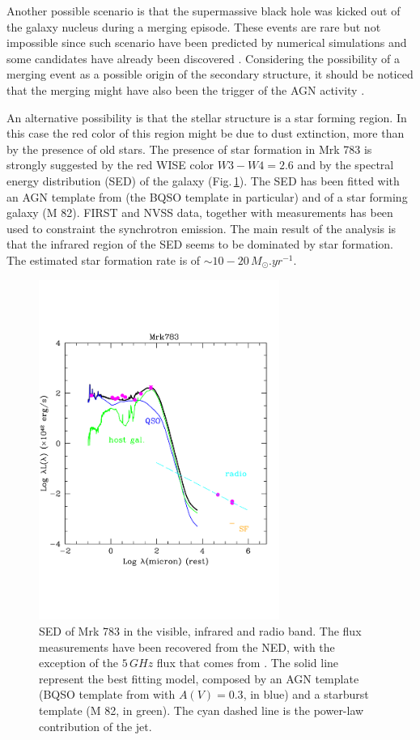 \documentclass[../main.tex]{subfiles}
\begin{document}
Another possible scenario is that the supermassive black hole was kicked out of the galaxy nucleus during a merging episode.
These events are rare but not impossible since such scenario have been predicted by numerical simulations and some candidates have already been discovered \citep[for a review see][]{Komossa12}.
Considering the possibility of a merging event as a possible origin of the secondary structure, it should be noticed that the merging  might have also been the trigger of the AGN activity \citep{Hong15}.

An alternative possibility is that the stellar structure is a star forming region.
In this case the red color of this region might be due to dust extinction, more than by the presence of old stars.
The presence of star formation in Mrk 783 is strongly suggested by the red WISE color $W3-W4=2.6$ and by the spectral energy distribution (SED) of the galaxy (Fig.\,\ref{fig:SED_mrk}).
The SED has been fitted with an AGN template from \citet{Polletta07} (the BQSO template in particular) and of a star forming galaxy (M 82).
FIRST and NVSS data, together with \citet{Congiu17} measurements has been used to constraint the synchrotron emission.
The main result of the analysis is that the infrared region of the SED seems to be dominated by star formation.
The estimated star formation rate is of $\sim 10-20\,\si{M_{\odot}.yr^{-1}}$.

\begin{figure}
\centering
\includegraphics[width=0.7\textwidth]{images/paper3/mrk783_senza_UVOT.pdf} 
\caption[]{SED of Mrk 783 in the visible, infrared and radio band. The flux measurements have been recovered from the NED, with the exception of the $5\,\si{GHz}$ flux that comes from \citet{Congiu17}. The solid line represent the best fitting model, composed by an AGN template (BQSO template from \cite{Polletta07} with $A(V)=0.3$, in blue) and a starburst template (M 82, in green).
The cyan dashed line is the power-law contribution of the jet.} 
\label{fig:SED_mrk}
\end{figure} 
\end{document}
